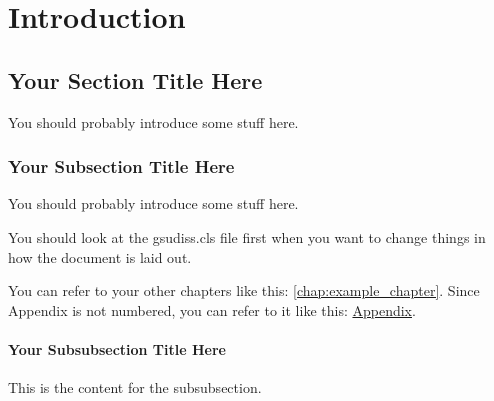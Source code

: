 \chapter{Introduction}
\label{chap:introduction}

\section{Your Section Title Here}
	You should probably introduce some stuff here.

\subsection{Your Subsection Title Here}
You should probably introduce some stuff here.

You should look at the gsudiss.cls file first when you want to change things in how the document is laid out. 

You can refer to your other chapters like this: \chap\ref{chap:example_chapter}. Since Appendix is not numbered, you can refer to it like this: \hyperref[chap:appendix]{Appendix}.

\subsubsection{Your Subsubsection Title Here}
This is the content for the subsubsection.

\lipsum[1-5]

